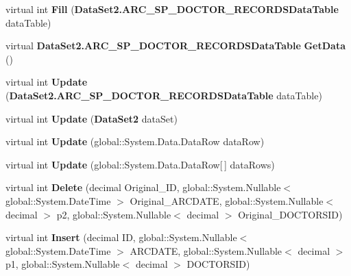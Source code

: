 \begin{CompactItemize}
\item 
virtual int \textbf{Fill} ({\bf DataSet2.ARC\_\-SP\_\-DOCTOR\_\-RECORDSDataTable} dataTable)\label{class_automatic_medical_system_1_1_data_set2_table_adapters_1_1_a_r_c___s_p___d_o_c_t_o_r___r_e_c_o_r_d_s_table_adapter_71d12e91432aea6a24b4fbce6e4b0cdf}

\item 
virtual {\bf DataSet2.ARC\_\-SP\_\-DOCTOR\_\-RECORDSDataTable} \textbf{GetData} ()\label{class_automatic_medical_system_1_1_data_set2_table_adapters_1_1_a_r_c___s_p___d_o_c_t_o_r___r_e_c_o_r_d_s_table_adapter_8d5794daad54afdfcb8374be8990f9f2}

\item 
virtual int \textbf{Update} ({\bf DataSet2.ARC\_\-SP\_\-DOCTOR\_\-RECORDSDataTable} dataTable)\label{class_automatic_medical_system_1_1_data_set2_table_adapters_1_1_a_r_c___s_p___d_o_c_t_o_r___r_e_c_o_r_d_s_table_adapter_30f3080c58a461bbdc883cd7d39acf63}

\item 
virtual int \textbf{Update} ({\bf DataSet2} dataSet)\label{class_automatic_medical_system_1_1_data_set2_table_adapters_1_1_a_r_c___s_p___d_o_c_t_o_r___r_e_c_o_r_d_s_table_adapter_7354f46f64524126df681d756467a064}

\item 
virtual int \textbf{Update} (global::System.Data.DataRow dataRow)\label{class_automatic_medical_system_1_1_data_set2_table_adapters_1_1_a_r_c___s_p___d_o_c_t_o_r___r_e_c_o_r_d_s_table_adapter_3749e50c22dce6648778382e8743b8f7}

\item 
virtual int \textbf{Update} (global::System.Data.DataRow[$\,$] dataRows)\label{class_automatic_medical_system_1_1_data_set2_table_adapters_1_1_a_r_c___s_p___d_o_c_t_o_r___r_e_c_o_r_d_s_table_adapter_d7907bf39ad8922dd4f1b66ce8348e50}

\item 
virtual int \textbf{Delete} (decimal Original\_\-ID, global::System.Nullable$<$ global::System.DateTime $>$ Original\_\-ARCDATE, global::System.Nullable$<$ decimal $>$ p2, global::System.Nullable$<$ decimal $>$ Original\_\-DOCTORSID)\label{class_automatic_medical_system_1_1_data_set2_table_adapters_1_1_a_r_c___s_p___d_o_c_t_o_r___r_e_c_o_r_d_s_table_adapter_97fc5f3dc7c7426bb1f65071f08b9930}

\item 
virtual int \textbf{Insert} (decimal ID, global::System.Nullable$<$ global::System.DateTime $>$ ARCDATE, global::System.Nullable$<$ decimal $>$ p1, global::System.Nullable$<$ decimal $>$ DOCTORSID)\label{class_automatic_medical_system_1_1_data_set2_table_adapters_1_1_a_r_c___s_p___d_o_c_t_o_r___r_e_c_o_r_d_s_table_adapter_e93bf9de49c0e69a55509a3891cd7fd4}


\end{CompactItemize}
